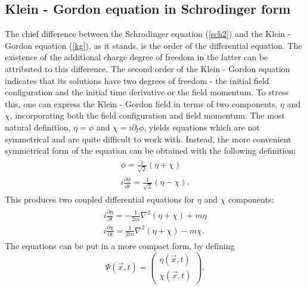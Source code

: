 \documentclass[11pt]{article}
\numberwithin{equation}{section}
\begin{document}
      \subsection{Klein - Gordon equation in Schrodinger form}
      The chief difference between the Schrodinger equation (\ref{sch2}) and the Klein - Gordon equation (\ref{kg}), as it stands, is the order of the differential equation.
      The existence of the additional charge degree of freedom in the latter can be attributed to this difference.
      The second order of the Klein - Gordon equation indicates that its solutions have two degrees of freedom - the initial field configuration and the initial time derivative or the field momentum.
      To stress this, one can express the Klein - Gordon field in terms of two components, $\eta$ and $\chi$, incorporating
      both the field configuration and field momentum. 
      The most natural definition, $\eta = \phi$ and $\chi = i \partial_t \phi$, yields equations which are
      not symmetrical and are quite difficult to work with. Instead, the more convenient symmetrical form of the equation can be obtained
      with the following definition:
      \begin{gather}
        \begin{gathered}
        \phi = \frac{ 1}{\sqrt{2}} (\eta + \chi)\\
        i \frac{\partial \phi}{\partial t} = \frac{ 1}{\sqrt{2}} (\eta - \chi). \label{component1}
        \end{gathered}
      \end{gather}
      This produces two coupled differential equations for $\eta$ and $\chi$ components:
      \begin{gather}
        \begin{gathered}
        i \frac{\partial \eta}{\partial t} = - \frac{1}{2m} \nabla^2 (\eta + \chi) + m \eta \\
        i \frac{\partial \chi}{\partial t} = \frac{1}{2m} \nabla^2 (\eta + \chi) - m \chi. \label{two_kg}
        \end{gathered}
      \end{gather}
      The equations can be put in a more compact form, by defining
      \begin{equation}
        \Psi(\vec x,t) = \begin{pmatrix}
          \eta(\vec x,t) \\
          \chi(\vec x,t)
        \end{pmatrix}. \label{component2}
      \end{equation}
\end{document}
